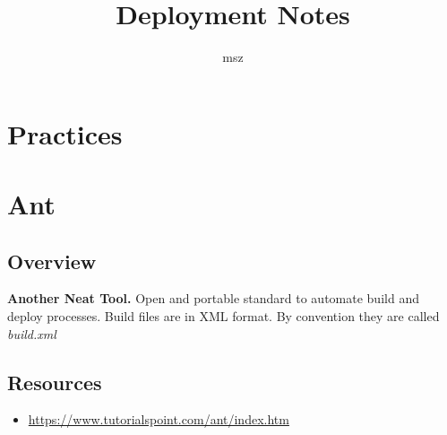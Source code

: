 \documentclass{report}
\title{Deployment Notes}
\author{msz}
\begin{document}
\tableofcontents




\part{Practices}




\part{Ant}



\chapter{Overview}
\textbf{Another Neat Tool.} Open and portable standard to automate 
build and deploy processes. Build files are in XML format. By convention 
they are called \textit{build.xml}



\chapter{Resources}

\begin{itemize}
  \item \url{https://www.tutorialspoint.com/ant/index.htm}
\end{itemize}
\end{document}
